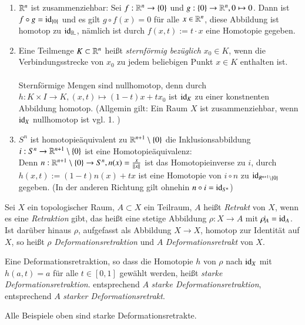 \documentclass[a4paper,10pt]{scrartcl}
\begin{document}
\begin{exs*}
 \begin{enumerate}
  \item $\mathbb{R}^n$ ist zusammenziehbar: Sei $f: \mathbb{R}^n\to \{0\}$ und $g:\{0\}\to \mathbb{R}^n, 0 \mapsto 0$. Dann ist $f\circ g=\operatorname{id}_{\{0\}}$ und es gilt $g\circ f(x)=0$ für alle $x\in \mathbb{R}^n$, diese Abbildung ist homotop zu $\id_{\R^^n}$, nämlich ist durch $f(x,t):= t\cdot x$ eine Homotopie gegeben.
  \item Eine Teilmenge $K\subset \mathbb{R}^n$ heißt \emph{sternförmig bezüglich} $x_0 \in K$, wenn die Verbindungsstrecke von $x_0$ zu jedem beliebigen Punkt $x\in K$ enthalten ist.\\
\fixme[fig44]\\
Sternförmige Mengen sind nullhomotop, denn durch $h: K\times I \to K, (x,t) \mapsto (1-t)x+tx_0$ ist $\operatorname{id}_K$ zu einer konstnenten Abbildung homotop. (Allgemin gilt: Ein Raum $X$ ist zusammenziehbar, wenn $\operatorname{id}_X$ nullhomotop ist vgl. 1. )
\item $S^n$ ist homotopieäquivalent zu $\mathbb{R}^{n+1}\setminus\{0\}$ die Inklusionsabbildung $i: S^n\to \mathbb{R}^{n+1}\setminus\{0\}$ ist eine Homotopieäquivalenz:
\fixme[fig45]\\
Denn $n: \mathbb{R}^{n+1}\setminus\{0\} \to S^n, n(x)=\frac{x}{||x||}$ ist das Homotopieinverse zu $i$, durch $h(x,t):=(1-t)n(x)+tx$ ist eine Homotopie von $i\circ n$ zu $\operatorname{id}_{R^{n+1}\setminus \{0\}}$ gegeben.
(In der anderen Richtung gilt ohnehin $n\circ i= \operatorname{id}_{S^n}$)
\end{enumerate}
\end{exs*}
\begin{df}
 Sei $X$ ein topologischer Raum, $A\subset X$ ein Teilraum, $A$ heißt \emph{Retrakt} von $X$, wenn es eine \emph{Retraktion} gibt, das heißt eine stetige Abbildung  $\rho: X\to A$ mit $\rho\vline_A=\id_A$. Ist darüber hinaus $\rho$, aufgefasst als Abbildung $X\to X$, homotop zur Identität auf $X$, so heißt $\rho$ \emph{Deformationsretraktion} und  $A$ \emph{Deformationsretrakt} von $X$.

Eine Deformationsretraktion, so dass die Homotopie $h$ von $\rho$ nach $\operatorname{id}_X$ mit $h(a,t)=a$ für alle $t\in[0,1]$ gewählt werden, heißt \emph{starke Deformationsretraktion}. entsprechend $A$ \emph{starke Deformationsretraktion}, entsprechend $A$ \emph{starker Deformationsretrakt}.
\end{df}
\begin{note*}
 Alle Beispiele oben sind starke Deformationsretrakte.
\end{note*}
\end{document}
